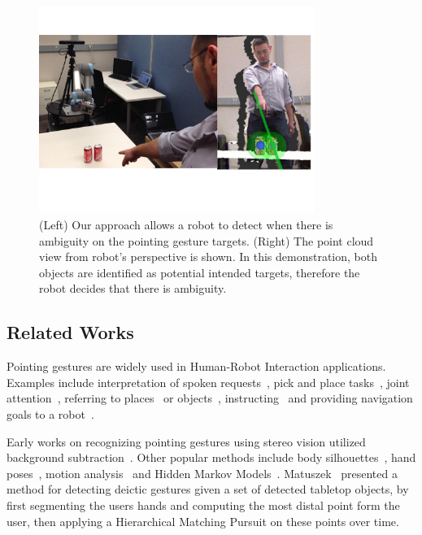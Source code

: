 \begin{figure}[ht!]
\centering
\includegraphics[width=0.8\textwidth]{pics/cover_pointing_gestures}
\caption{(Left) Our approach allows a robot to detect when there is ambiguity on the pointing gesture targets. (Right) The point cloud view from robot's perspective is shown. In this demonstration, both objects are identified as potential intended targets, therefore the robot decides that there is ambiguity.}
\label{fig:cover_pointing_gestures}
\end{figure}

\subsection{Related Works}
\label{sec:pointing_related_works}

Pointing gestures are widely used in Human-Robot Interaction applications. Examples include interpretation of spoken requests~\cite{zukerman2010interpreting}, pick and place tasks~\cite{blodow2011inferring}, joint attention~\cite{droeschel2011towards}, referring to places~\cite{hato2010pointing} or objects~\cite{schmidt2008interacting}, instructing~\cite{martin2010estimation} and providing navigation goals to a robot~\cite{raza2013human}. 

Early works on recognizing pointing gestures using stereo vision utilized background subtraction~\cite{cipolla1996human,jojic2000detection,kahn1995understanding}. Other popular methods include body silhouettes~\cite{kehl2004real}, hand poses~\cite{hu2010hand}, motion analysis~\cite{matikainen2011prop} and Hidden Markov Models~\cite{wilson1999parametric, bennewitz2008robust, li2005hierarchical, nickel2003pointing, droeschel2011learning, aly2012integrated}. Matuszek~\cite{matuszek2014learning} presented a method for detecting deictic gestures given a set of detected tabletop objects, by first segmenting the users hands and computing the most distal point form the user, then applying a Hierarchical Matching Pursuit on these points over time. 

